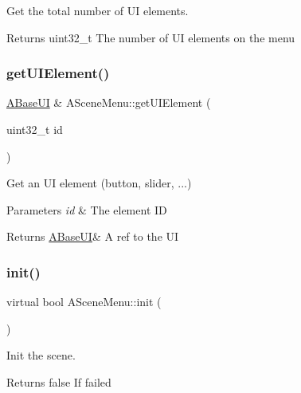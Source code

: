 Get the total number of UI elements. 

\begin{DoxyReturn}{Returns}
uint32\+\_\+t The number of UI elements on the menu 
\end{DoxyReturn}
\mbox{\label{class_a_scene_menu_a251ef83adb546bb22915f52986bc7d84}} 
\subsubsection{\texorpdfstring{get\+U\+I\+Element()}{getUIElement()}}
{\footnotesize\ttfamily \hyperlink{class_a_base_u_i}{A\+Base\+UI} \& A\+Scene\+Menu\+::get\+U\+I\+Element (\begin{DoxyParamCaption}\item[{uint32\+\_\+t}]{id }\end{DoxyParamCaption})}



Get an UI element (button, slider, ...) 


\begin{DoxyParams}{Parameters}
{\em id} & The element ID \\
\hline
\end{DoxyParams}
\begin{DoxyReturn}{Returns}
\hyperlink{class_a_base_u_i}{A\+Base\+UI}\& A ref to the UI 
\end{DoxyReturn}
\mbox{\label{class_a_scene_menu_a78bdee98bd7df224524586a060f9bdec}} 
\subsubsection{\texorpdfstring{init()}{init()}}
{\footnotesize\ttfamily virtual bool A\+Scene\+Menu\+::init (\begin{DoxyParamCaption}{ }\end{DoxyParamCaption})\hspace{0.3cm}{\ttfamily [pure virtual]}}



Init the scene. 

\begin{DoxyReturn}{Returns}
false If failed 
\end{DoxyReturn}



